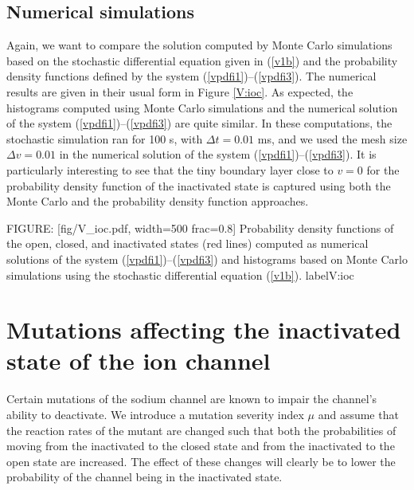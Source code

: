 \subsection{Numerical simulations}
Again, we want to compare the solution computed by Monte Carlo simulations based on the stochastic
differential equation given in (\ref{v1b}) and the probability density functions defined by the system  (\ref{vpdfi1})--(\ref{vpdfi3}).
The numerical results are given in their usual form in Figure \ref{V:ioc}. 
As expected, the histograms computed using Monte Carlo simulations
and the numerical solution of the system  (\ref{vpdfi1})--(\ref{vpdfi3}) are quite similar. In these computations, 
the stochastic simulation ran for 100 s, with $\Delta t=0.01$ ms, and we used the mesh size $\Delta v=0.01$ in the numerical solution of the system  (\ref{vpdfi1})--(\ref{vpdfi3}). It is particularly interesting to
see that the tiny boundary layer close to $v=0$ for the probability density function of the inactivated state is captured using both the Monte Carlo and the probability density function approaches.


FIGURE: [fig/V_ioc.pdf, width=500 frac=0.8] Probability density functions of the open, closed, and inactivated states
(red lines) computed as numerical solutions of the system (\ref{vpdfi1})--(\ref{vpdfi3}) and
histograms based on Monte Carlo simulations using the stochastic differential
equation (\ref{v1b}). 
 label{V:ioc}
\section[Mutations affecting inactivation]{Mutations affecting the inactivated state of the ion channel}
\label{mutaffectinactiv}

Certain mutations of the sodium channel are known to impair the
channel's ability to deactivate. We introduce a mutation severity index $\mu$
and assume that the reaction rates of the mutant are changed such that both
the probabilities of moving from the inactivated to the closed state and from the 
inactivated to the open state are increased. The effect of these changes will clearly be to lower 
the probability of the channel being in the inactivated state.

